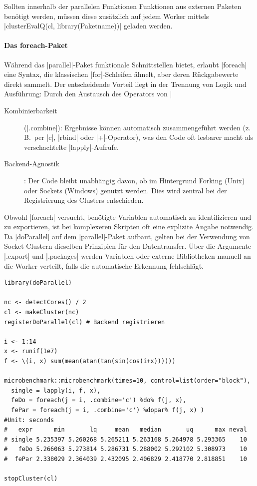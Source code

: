 \documentclass[10pt,twocolumn]{scrartcl}
\renewcommand{\lstinline}{\mycoloredinline}
\begin{document}
Sollten innerhalb der parallelen Funktionen Funktionen aus externen Paketen benötigt werden, müssen diese zusätzlich auf jedem Worker mittels \lstinline|clusterEvalQ(cl, library(Paketname))| geladen werden.


\paragraph{Das foreach-Paket}

Während das \lstinline|parallel|-Paket funktionale Schnittstellen bietet, erlaubt \lstinline|foreach| eine Syntax, die klassischen \lstinline|for|-Schleifen ähnelt, aber deren Rückgabewerte direkt sammelt. Der entscheidende Vorteil liegt in der Trennung von Logik und Ausführung: Durch den Austausch des Operators von \lstinline|%do%| (sequentiell) zu \lstinline|%dopar%| (parallel) kann derselbe Code ohne Umstrukturierung parallelisiert werden. Hierfür muss lediglich ein passendes Backend (z.\,B.\ \lstinline|doParallel|) registriert werden.

\begin{description}
\item[Kombinierbarkeit] (\lstinline|.combine|): Ergebnisse können automatisch zusammengeführt werden (z.\,B.\ per \lstinline|c|, \lstinline|rbind| oder \lstinline|+|-Operator), was den Code oft lesbarer macht als verschachtelte \lstinline|lapply|-Aufrufe.
\item[Backend-Agnostik]: Der Code bleibt unabhängig davon, ob im Hintergrund Forking (Unix) oder Sockets (Windows) genutzt werden. Dies wird zentral bei der Registrierung des Clusters entschieden.
\end{description}

Obwohl \lstinline|foreach| versucht, benötigte Variablen automatisch zu identifizieren und zu exportieren, ist bei komplexeren Skripten oft eine explizite Angabe notwendig. Da \lstinline|doParallel| auf dem \lstinline|parallel|-Paket aufbaut, gelten bei der Verwendung von Socket-Clustern dieselben Prinzipien für den Datentransfer. Über die Argumente \lstinline|.export| und \lstinline|.packages| werden Variablen oder externe Bibliotheken manuell an die Worker verteilt, falls die automatische Erkennung fehlschlägt.

\begin{lstlisting}[basicstyle=\fontsize{9.3pt}{9.7pt}\selectfont\ttfamily]
library(doParallel)

nc <- detectCores() / 2
cl <- makeCluster(nc)
registerDoParallel(cl) # Backend registrieren

i <- 1:14
x <- runif(1e7)
f <- \(i, x) sum(mean(atan(tan(sin(cos(i+x))))))

microbenchmark::microbenchmark(times=10, control=list(order="block"),
  single = lapply(i, f, x),
  feDo = foreach(j = i, .combine='c') %do% f(j, x),
  fePar = foreach(j = i, .combine='c') %dopar% f(j, x) )
#Unit: seconds
#   expr      min       lq     mean   median       uq      max neval
# single 5.235397 5.260268 5.265211 5.263168 5.264978 5.293365    10
#   feDo 5.266063 5.273814 5.286731 5.288002 5.292102 5.308973    10
#  fePar 2.338029 2.364039 2.432095 2.406829 2.418770 2.818851    10

stopCluster(cl)
\end{lstlisting}
\end{document}
